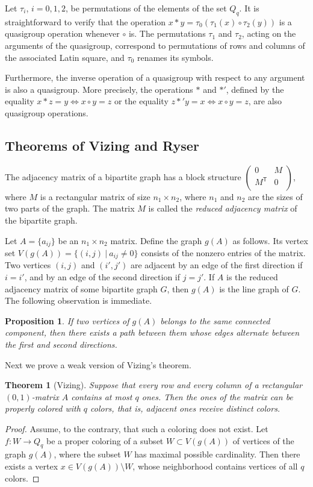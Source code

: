\documentclass[11pt]{article}
\newtheorem{theorem}{Theorem}[section]
\newtheorem{claim}{Proposition}[section]
\theoremstyle{definition}
\begin{document}
{{{Let $\tau_i$, $i=0,1,2$, be permutations of the elements of the set
$Q_q$.
It is straightforward to verify that the operation
  $x*y=\tau_0(\tau_1(x) \circ
\tau_2 (y))$ is a quasigroup  operation  whenever $\circ$ is.  The permutations $\tau_1$ and $\tau_2$, acting on the arguments
of the quasigroup, correspond to permutations of rows and columns of  the associated
Latin square, and  $\tau_0$ renames its symbols.

Furthermore,  the inverse operation of a quasigroup with respect to any argument is also a quasigroup. More precisely, the operations $*$ and $*'$,
defined by the equality $x*z=y \Leftrightarrow x\circ y=z$ or
the equality $z*'y=x \Leftrightarrow x\circ y=z$, are also
quasigroup operations.


\subsection{Theorems of Vizing and Ryser}\label{7.2}


The adjacency matrix of a bipartite graph has a block
structure $ \left(\begin{array}{ll}
0 & M \\
M^{\mathsf T} & 0   \\
\end{array} \right)$, where $M$ is a rectangular matrix of size $n_1\times n_2$, where $n_1$ and $n_2$ are the sizes of two parts of the graph.
The matrix $M$ is called the {\sl reduced adjacency matrix} of the bipartite
graph.

Let $A=\{a_{ij}\}$ be an  $n_1\times n_2$ matrix.
Define the graph $g(A)$ as follows. Its vertex set
$V(g(A))=\{(i,j) \ |\ a_{ij}\neq 0\}$ consists of the nonzero entries
of the matrix.
 Two vertices $(i,j)$ and $(i',j')$
 are adjacent by an edge of the first
direction if $i=i'$, and by an edge of the second direction if $j=j'$.
If $A$ is the reduced adjacency matrix of some bipartite
graph $G$, then  $g(A)$ is  the line graph of
$G$. The following observation is immediate.


\begin{claim}\label{mper031} If two vertices of $g(A)$ belongs
 to the same connected component, then there exists a path between them whose edges alternate between the first and second directions.
\end{claim}

Next we prove a weak version of Vizing's theorem. 

\begin{theorem}[Vizing]\label{mper041}
Suppose that every row and every column of a rectangular $(0,1)$-matrix $A$ contains at most $q$ ones. Then the ones of the matrix can be properly colored with $q$ colors, that is, adjacent ones receive distinct colors.
\end{theorem}
\begin{proof}
Assume, to the contrary, that such a coloring does not exist.
Let $f:W\rightarrow
Q_q$
be a proper coloring of a subset $W\subset V(g(A))$ of vertices of the graph $g(A)$, where the subset $W$
has maximal possible cardinality.
 Then there exists a
vertex $x\in V(g(A))\setminus W$,  whose neighborhood contains
vertices of all $q$ colors.



\end{proof}}}}
\end{document}
